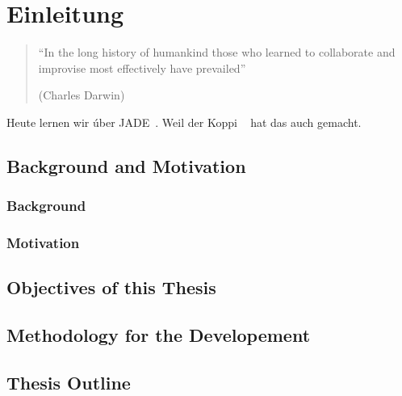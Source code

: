 \chapter{Einleitung} \label{chapter:introduction}

\begin{quotation}

``In the long history of humankind those who learned to collaborate and improvise most effectively have prevailed''

\begin{flushright}
(Charles Darwin)
\end{flushright}

\end{quotation}

Heute lernen wir \'uber JADE~\cite{bellifemine_developing_2007}. Weil der Koppi ~\cite{koppensteiner_knowledge_2011} hat das auch gemacht.




\section{Background and Motivation} \label{background}

\subsection {Background}

\subsection{Motivation}

\section{Objectives of this Thesis}

\section{Methodology for the Developement}  \label{sec:metho}

\section{Thesis Outline}
